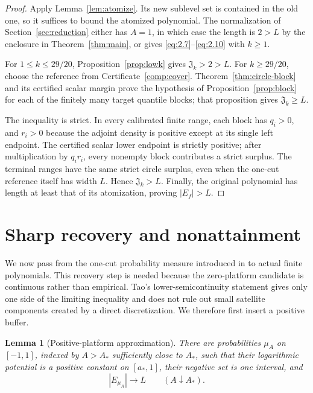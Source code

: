 \documentclass[11pt]{article}
\numberwithin{equation}{section}
\theoremstyle{plain}
\newtheorem{lemma}[theorem]{Lemma}
\theoremstyle{definition}
\theoremstyle{remark}
\newcommand{\1}{\mathbf 1}
\newcommand{\J}{\mathfrak J}
\begin{document}
\begin{proof}
Apply Lemma~\ref{lem:atomize}.  Its new sublevel set is contained in the
old one, so it suffices to bound the atomized polynomial.  The normalization
of Section~\ref{sec:reduction} either has $A=1$, in which case the length
is $2>L$ by the enclosure in Theorem~\ref{thm:main}, or gives
\eqref{eq:2.7}--\eqref{eq:2.10} with $k\ge1$.

For $1\le k\le29/20$, Proposition~\ref{prop:lowk} gives
$\J_k>2>L$.  For $k\ge29/20$, choose the reference from
Certificate~\ref{comp:cover}.  Theorem~\ref{thm:circle-block} and its
certified scalar margin prove the hypothesis of
Proposition~\ref{prop:block} for each of the finitely many target quantile
blocks; that proposition gives $\J_k\ge L$.

The inequality is strict.  In every calibrated finite range, each block has
$q_i>0$, and $r_i>0$ because the adjoint density is positive except at its
single left endpoint.  The certified scalar lower endpoint is strictly
positive; after multiplication by $q_ir_i$, every nonempty block contributes
a strict surplus.  The terminal ranges have the same strict circle surplus,
even when the one-cut reference itself has width $L$.  Hence
$\J_k>L$.  Finally, the original polynomial has length at least that of its
atomization, proving $|E_f|>L$.
\end{proof}

\section{Sharp recovery and nonattainment}\label{sec:recovery}

We now pass from the one-cut probability measure introduced in
\cite[Section~4]{Tao1038Updated} to actual finite polynomials.  This recovery
step is needed because the zero-platform candidate is continuous rather
than empirical.  Tao's lower-semicontinuity statement
\cite[Lemma~1.1]{Tao1038Updated} gives only one side of the limiting
inequality and does not rule out small satellite components created by a
direct discretization.  We therefore first insert a positive buffer.

\begin{lemma}[Positive-platform approximation]\label{lem:positive-buffer}
There are probabilities $\mu_A$ on $[-1,1]$, indexed by
$A>A_*$ sufficiently close to $A_*$, such that their logarithmic potential
is a positive constant on $[a_*,1]$, their negative set is one interval,
and
\[
 |E_{\mu_A}|\longrightarrow L\qquad(A\downarrow A_*).
\]
\end{lemma}
\end{document}
